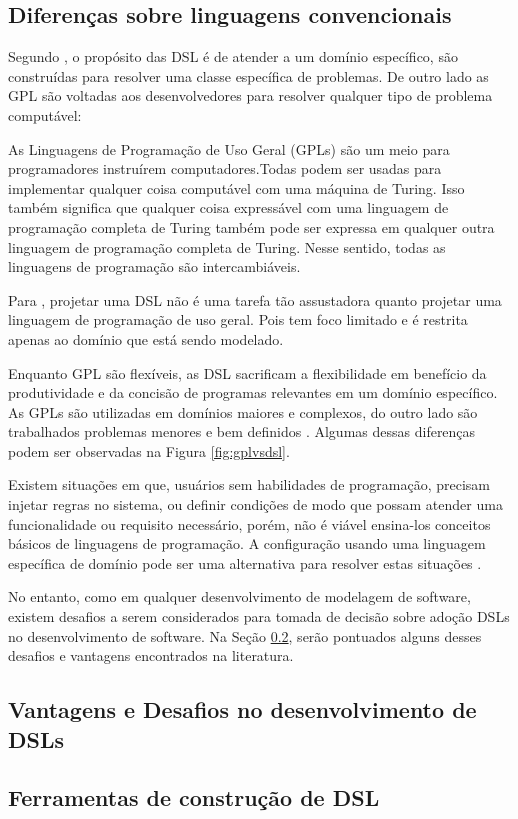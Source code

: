 \subsection{Diferenças sobre linguagens convencionais}
\label{diferencasdsl}

Segundo , o propósito das \gls{DSL} é de atender a um domínio específico, são construídas para resolver uma classe específica de problemas. De outro lado as \gls{GPL} são voltadas aos desenvolvedores para resolver qualquer tipo de problema computável:

\begin{citacao}
As Linguagens de Programação de Uso Geral (GPLs) são um meio para programadores instruírem computadores.Todas podem ser usadas para implementar qualquer coisa computável com uma máquina de Turing. Isso também significa que qualquer coisa expressável com uma linguagem de programação completa de Turing também pode ser expressa em qualquer outra linguagem de programação completa de Turing. Nesse sentido, todas as linguagens de programação são intercambiáveis. \cite{dslengineering}
\end{citacao}

Para , projetar uma DSL não é uma tarefa tão assustadora quanto projetar uma linguagem de programação de uso geral. Pois tem foco limitado e é restrita apenas ao domínio que está sendo modelado.

Enquanto \gls{GPL} são flexíveis, as \gls{DSL} sacrificam a flexibilidade em benefício da produtividade e da concisão de programas relevantes em um domínio específico. As \gls{GPL}s são utilizadas em domínios maiores e complexos, do outro lado são trabalhados problemas menores e bem definidos \cite{dslengineering}. Algumas dessas diferenças podem ser observadas na  Figura \ref{fig:gplvsdsl}.



Existem situações em que, usuários sem habilidades de programação, precisam injetar regras no sistema, ou definir condições de modo que possam atender uma funcionalidade ou requisito necessário, porém, não é viável ensina-los conceitos básicos de linguagens de programação. A configuração usando uma linguagem específica de domínio pode ser uma alternativa para resolver estas situações \cite{novak2010easy}.  

No entanto, como em qualquer desenvolvimento de modelagem de software, existem desafios a serem considerados para tomada de decisão sobre adoção \gls{DSL}s no desenvolvimento de software. Na Seção \ref{beneficiosdsl}, serão pontuados alguns desses desafios e vantagens encontrados na literatura.

\subsection{Vantagens e Desafios no desenvolvimento de DSLs}
\label{beneficiosdsl}



\subsection{Ferramentas de construção de DSL}
\label{ferramentasdsl}
